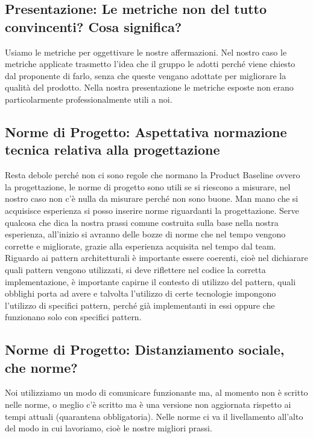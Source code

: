 \subsection{Presentazione: Le metriche non del tutto convincenti? Cosa significa?}
Usiamo le metriche per oggettivare le nostre affermazioni. Nel nostro caso le metriche applicate trasmetto l'idea che il gruppo le adotti perché viene chiesto dal proponente di farlo, senza che queste vengano adottate per migliorare la qualità del prodotto. Nella nostra presentazione le metriche esposte non erano particolarmente professionalmente utili a noi.  

\subsection{Norme di Progetto: Aspettativa normazione tecnica relativa alla progettazione}
Resta debole perché non ci sono regole che normano la Product Baseline ovvero la progettazione, le norme di progetto sono utili se si riescono a misurare, nel nostro caso non c'è nulla da misurare perché non sono buone. Man mano che si acquisisce esperienza si posso inserire norme riguardanti la progettazione. Serve qualcosa che dica la nostra prassi comune costruita sulla base nella nostra esperienza, all'inizio si avranno delle bozze di norme che nel tempo vengono corrette e migliorate, grazie alla esperienza acquisita nel tempo dal team. Riguardo ai pattern architetturali è importante essere coerenti, cioè nel dichiarare quali pattern vengono utilizzati, si deve riflettere nel codice la corretta implementazione, è importante capirne il contesto di utilizzo del pattern, quali obblighi porta ad avere e talvolta l'utilizzo di certe tecnologie impongono l'utilizzo di specifici pattern, perché già implementanti in essi oppure che funzionano solo con specifici pattern.

\subsection{Norme di Progetto: Distanziamento sociale, che norme?}
Noi utilizziamo un modo di comunicare funzionante ma, al momento non è scritto nelle norme, o meglio c'è scritto ma è una versione non aggiornata rispetto ai tempi attuali (quarantena obbligatoria). Nelle norme ci va il livellamento all'alto del modo in cui lavoriamo, cioè le nostre migliori prassi. 

